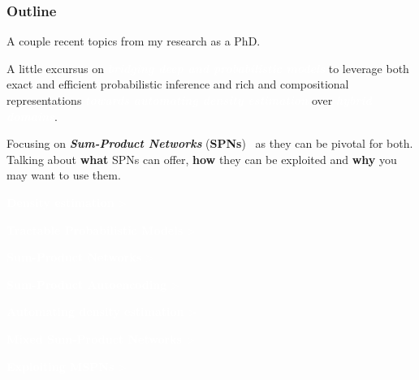 \documentclass[xcolor={usenames,dvipsnames,svgnames}, compress]{beamer}
\newcommand{\highlighttext}[2][yellow]{{\colorbox{#1}{\textcolor{white}{#2}}}}
\begin{document}
\begin{frame}[t]
  \frametitle{Outline}
  \footnotesize

  A couple recent topics from my research as a PhD.\par
  A little excursus on  
   \highlighttext[tomato4]{\emph{\textbf{bridging deep and probabilistic models}}} to leverage both
    exact and efficient probabilistic inference and rich and
    compositional representations
   \highlighttext[bgrey2]{\textbf{\emph{towards automating density
         estimation}}} over \highlighttext[peas4]{\emph{\textbf{hybrid domains}}}.\par\bigskip


  Focusing on \emph{\textbf{Sum-Product Networks}}
  (\textbf{SPNs})~\emph{\parencite{Poon2011}} as they can be pivotal for both.
  Talking about \textbf{what} SPNs can offer,
  \textbf{how} they can be exploited and \textbf{why} you may want to use them.\par\bigskip

  
  \highlighttext[tomato2]{\textbf{Density estimation} >}\par
  \hspace{20pt} \highlighttext[tomato2]{\textbf{Tractable Probabilistic Models} >}\par
  \hspace{40pt} \highlighttext[tomato3]{\textbf{Sum-Product Networks} >}\par
  \hspace{60pt} \highlighttext[bgrey2]{\textbf{Sum-Product
      Autoencoding} >}\par
  \hspace{80pt} \highlighttext[bgrey4]{\textbf{Automating density estimation} >}\par
  \hspace{100pt} \highlighttext[peas2]{\textbf{Mixed Sum-Product Networks} >} \par
  \hspace{120pt} \highlighttext[peas4]{\textbf{Exploiting MSPNs} >}\par
  \par\bigskip

  
\end{frame}
\end{document}
